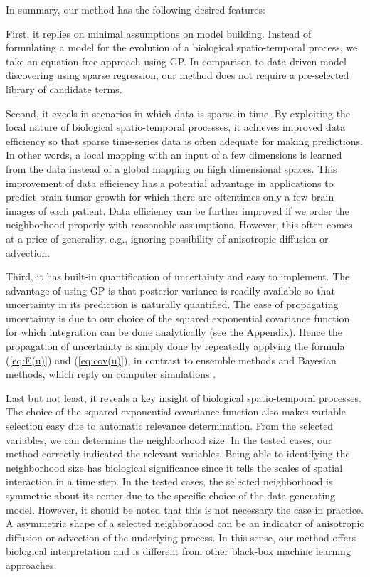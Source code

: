 \documentclass[smallextended,natbib]{svjour3}       %
\begin{document}
In summary, our method has the following desired features:

First, it replies on minimal assumptions on model building. Instead of formulating a model for the evolution of a biological spatio-temporal process, we take an equation-free approach using GP. In comparison to data-driven model discovering using sparse regression, our method does not require a pre-selected library of candidate terms.

Second, it excels in scenarios in which data is sparse in time. By exploiting the local nature of biological spatio-temporal processes, it achieves improved data efficiency so that sparse time-series data is often adequate for making predictions. In other words, a local mapping with an input of a few dimensions is learned from the data instead of a global mapping on high dimensional spaces. This improvement of data efficiency has a potential advantage in applications to predict brain tumor growth for which there are oftentimes only a few brain images of each patient. Data efficiency can be further improved if we order the neighborhood properly with reasonable assumptions. However, this often comes at a price of generality, e.g., ignoring possibility of anisotropic diffusion or advection.   

Third, it has built-in quantification of uncertainty and easy to implement. The advantage of using GP is that posterior variance is readily available so that uncertainty in its prediction is naturally quantified. The ease of propagating uncertainty is due to our choice of the squared exponential covariance function for which integration can be done analytically (see the Appendix). Hence the propagation of uncertainty is simply done by repeatedly applying the formula (\ref{eq:E(u)}) and (\ref{eq:cov(u)}), in contrast to ensemble methods and Bayesian methods, which reply on computer simulations \citep{lipkova2019personalized,Kostelich2011a}.   

Last but not least, it reveals a key insight of biological spatio-temporal processes.  The choice of the squared exponential covariance function also makes variable selection easy due to automatic relevance determination. From the selected variables, we can determine the neighborhood size. In the tested cases, our method correctly indicated the relevant variables. Being able to identifying the neighborhood size has biological significance since it tells the scales of spatial interaction in a time step. In the tested cases, the selected neighborhood is symmetric about its center due to the specific choice of the data-generating model. However, it should be noted that this is not necessary the case in practice. A asymmetric shape of a selected neighborhood can be an indicator of anisotropic diffusion or advection of the underlying process. In this sense, our method offers biological interpretation and is different from other black-box machine learning approaches. 
\end{document}
